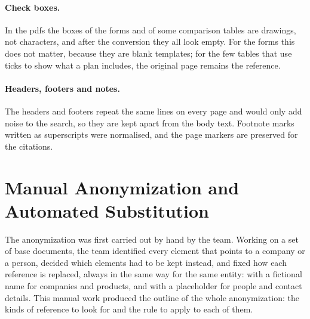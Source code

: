 \paragraph{Check boxes.} In the \acsp{pdf} the boxes of the forms and of some comparison tables are
drawings, not characters, and after the conversion they all look empty. For the forms this does not
matter, because they are blank templates; for the few tables that use ticks to show what a plan
includes, the original page remains the reference.

\paragraph{Headers, footers and notes.} The headers and footers repeat the same lines on every page
and would only add noise to the search, so they are kept apart from the body text. Footnote marks
written as superscripts were normalised, and the page markers are preserved for the citations.

\section{Manual Anonymization and Automated Substitution}
\label{sec:anonymization}

The anonymization was first carried out by hand by the team. Working on a set of base documents,
the team identified every element that points to a company or a person, decided which elements had
to be kept instead, and fixed how each reference is replaced, always in the same way for the same
entity: with a fictional name for companies and products, and with a placeholder for people and
contact details. This manual work produced the outline of the whole anonymization: the kinds of
reference to look for and the rule to apply to each of them.

